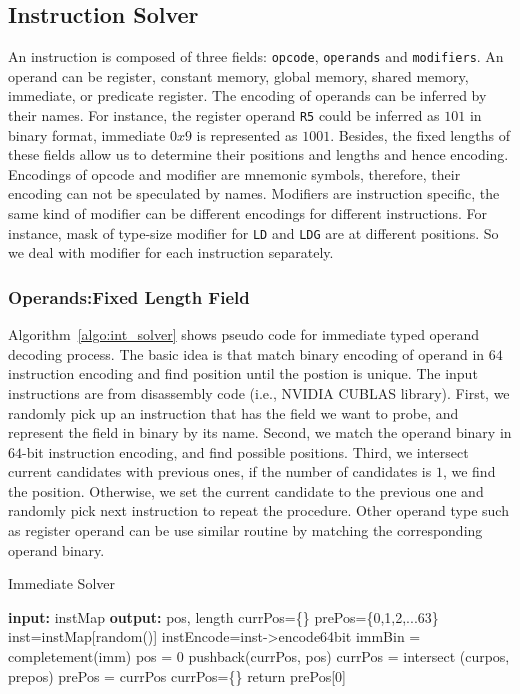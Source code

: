\subsection{Instruction Solver}
An instruction is composed of three fields: {\tt opcode}, {\tt operands} and {\tt modifiers}. An operand can be register, constant memory, global memory, shared memory, immediate, or predicate register.
The encoding of operands can be inferred by their names. For instance, the register operand {\tt R5} could be
inferred as $101$ in binary format, immediate $0x9$ is represented as $1001$. Besides, the fixed lengths of these fields allow us to determine their positions and lengths and hence encoding. Encodings of opcode and modifier are mnemonic symbols, therefore, their encoding can not be speculated by names. Modifiers are instruction specific, the same kind of modifier can be different encodings for different instructions. For instance, mask of type-size
modifier for {\tt LD} and {\tt LDG} are at different positions. So we deal with modifier for each instruction separately.

\subsubsection{Operands:Fixed Length Field}
Algorithm~\ref{algo:int_solver} shows pseudo code for immediate typed operand decoding process. 
The basic idea is that match binary encoding of operand in $64$ instruction encoding and find
position until the postion is unique. The input instructions are from disassembly code (i.e., NVIDIA CUBLAS library).
First, we randomly pick up an instruction that has the field we want to probe, and represent the field in binary by its name. Second, we match the operand binary in $64$-bit instruction encoding, and find possible positions. Third, we intersect current candidates with previous ones, if the number of candidates is $1$, we find the position. Otherwise, we set the current candidate to the previous one and randomly pick next instruction to repeat the procedure.
Other operand type such as register operand can be use similar routine by matching the corresponding operand binary.

\begin{algorithm}
      \caption{Immediate Solver}
      \label{algo:int_solver}
  \begin{algorithmic}[1]
	  \State \textbf{input:} instMap
      \State \textbf{output:} pos, length
      \State currPos=\{\}
      \State prePos=\{0,1,2,...63\}
      \State inst=instMap[random()]
      \State instEncode=inst->encode64bit
      \State immBin = completement(imm)
      \State pos = 0
      \State pushback(currPos, pos)
      \EndIf
      \EndWhile
      \State currPos = intersect (curpos, prepos)
      \State prePos = currPos
      \State currPos=\{\}
      \EndIf
      \EndWhile
      \State return prePos[0]
  \end{algorithmic}
\end{algorithm}

